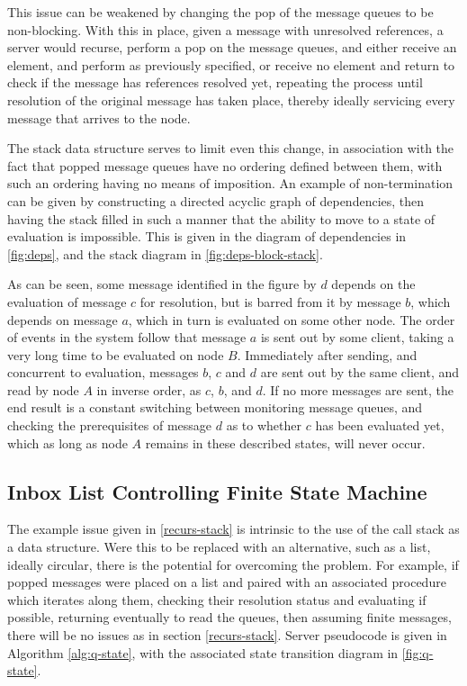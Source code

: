 This issue can be weakened by changing the pop of the message queues to be
non-blocking.
With this in place, given a message with unresolved references, a server would
recurse, perform a pop on the message queues, and either receive an element,
and perform as previously specified, or receive no element and return to check
if the message has references resolved yet, repeating the process until
resolution of the original message has taken place, thereby ideally servicing
every message that arrives to the node.

The stack data structure serves to limit even this change, in association with
the fact that popped message queues have no ordering defined between them, with
such an ordering having no means of imposition.
An example of non-termination can be given by constructing a directed acyclic
graph of dependencies, then having the stack filled in such a manner that the
ability to move to a state of evaluation is impossible.
This is given in the diagram of dependencies in \cref{fig:deps}, and the
stack diagram in \cref{fig:deps-block-stack}.



As can be seen, some message identified in the figure by \(d\) depends on the
evaluation of message \(c\) for resolution, but is barred from it by message
\(b\), which depends on message \(a\), which in turn is evaluated on some other
node.
The order of events in the system follow that message \(a\) is sent out by some
client, taking a very long time to be evaluated on node \(B\).
Immediately after sending, and concurrent to evaluation, messages \(b\), \(c\)
and \(d\) are sent out by the same client, and read by node \(A\) in inverse
order, as \(c\), \(b\), and \(d\).
If no more messages are sent, the end result is a constant switching between
monitoring message queues, and checking the prerequisites of message \(d\) as
to whether \(c\) has been evaluated yet, which as long as node \(A\) remains in
these described states, will never occur.

\subsection{Inbox List Controlling Finite State Machine}
\label{inbox-list}

The example issue given in \cref{recurs-stack} is intrinsic to the use
of the call stack as a data structure.
Were this to be replaced with an alternative, such as a list, ideally circular,
there is the potential for overcoming the problem.
For example, if popped messages were placed on a list and paired with an
associated procedure which iterates along them, checking their resolution
status and evaluating if possible, returning eventually to read the queues,
then assuming finite messages, there will be no issues as in section
\cref{recurs-stack}.
Server pseudocode is given in Algorithm \ref{alg:q-state}, with the associated
state transition diagram in \cref{fig:q-state}.

